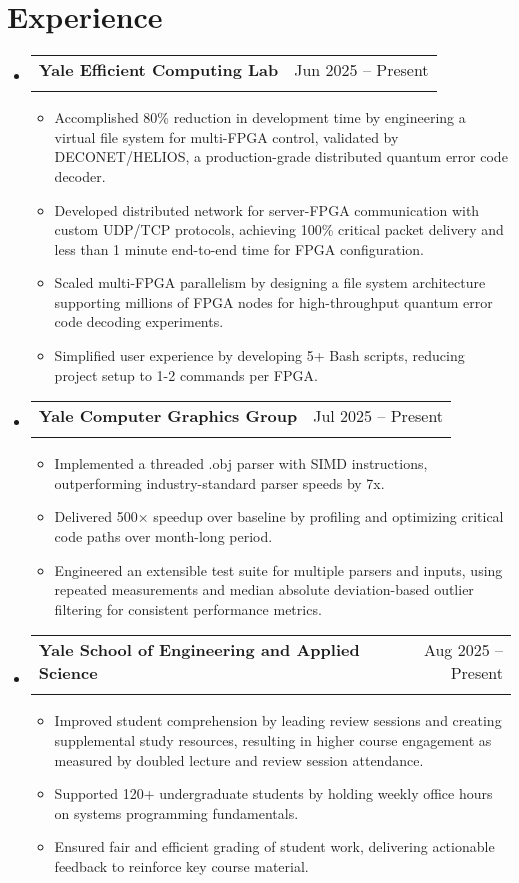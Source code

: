\documentclass[letterpaper,11pt]{article}
\makeatletter
\newcommand{\resumeItem}[1]{
  \item\small{
    {#1 \vspace{-2pt}}
  }
}
\newcommand{\resumeSubheading}[4]{
  \vspace{-2pt}\item
    \begin{tabular*}{0.97\textwidth}[t]{l@{\extracolsep{\fill}}r}
      \textbf{#1} & #2 \\
      \text{\small#3} & \text{\small #4} \\
    \end{tabular*}\vspace{-7pt}
}
\newcommand{\resumeSubHeadingListStart}{\begin{itemize}[leftmargin=0.15in, label={}]}
\newcommand{\resumeSubHeadingListEnd}{\end{itemize}}
\newcommand{\resumeItemListStart}{\begin{itemize}}
\newcommand{\resumeItemListEnd}{\end{itemize}\vspace{-5pt}}
\makeatother
\begin{document}
\section{Experience}
  \resumeSubHeadingListStart
    \resumeSubheading
      {Yale Efficient Computing Lab}{Jun 2025 -- Present}
      {Research Assistant (advised by Prof. Lin Zhong)}{New Haven, CT}
      \resumeItemListStart
        \resumeItem{Accomplished 80\% reduction in development time by engineering a virtual file system for multi-FPGA control, validated by DECONET/HELIOS, a production-grade distributed quantum error code decoder.}
        \resumeItem{Developed distributed network for server-FPGA communication with custom UDP/TCP protocols, achieving 100\% critical packet delivery and less than 1 minute end-to-end time for FPGA configuration.}
        \resumeItem{Scaled multi-FPGA parallelism by designing a file system architecture supporting millions of FPGA nodes for high-throughput quantum error code decoding experiments.}
        \resumeItem{Simplified user experience by developing 5+ Bash scripts, reducing project setup to 1-2 commands per FPGA.}
      \resumeItemListEnd
    \resumeSubheading
      {Yale Computer Graphics Group}{Jul 2025 -- Present}
      {Researcher (advised by Prof. Mike Shah)}{Part-time, New Haven, CT}
      \resumeItemListStart
        \resumeItem{Implemented a threaded .obj parser with SIMD instructions, outperforming industry-standard parser speeds by 7x.}
        \resumeItem{Delivered 500× speedup over baseline by profiling and optimizing critical code paths over month-long period.}
        \resumeItem{Engineered an extensible test suite for multiple parsers and inputs, using repeated measurements and median absolute deviation-based outlier filtering for consistent performance metrics.}
      \resumeItemListEnd
    \resumeSubheading
      {Yale School of Engineering and Applied Science}{Aug 2025 -- Present}
      {Teaching Assistant (Computer Systems)}{Part-time, New Haven, CT}
      \resumeItemListStart
        \resumeItem{Improved student comprehension by leading review sessions and creating supplemental study resources, resulting in higher course engagement as measured by doubled lecture and review session attendance.}
        \resumeItem{Supported 120+ undergraduate students by holding weekly office hours on systems programming fundamentals.}
        \resumeItem{Ensured fair and efficient grading of student work, delivering actionable feedback to reinforce key course material.}
      \resumeItemListEnd
  \resumeSubHeadingListEnd
\end{document}
